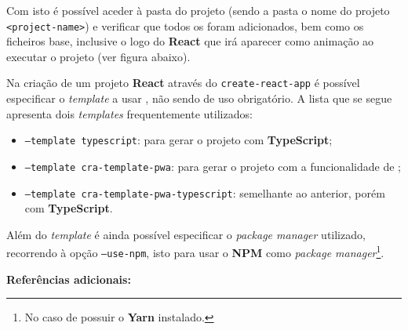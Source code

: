Com isto é possível aceder à pasta do projeto (sendo a pasta o nome do projeto \textemdash~ \texttt{<project-name>}) e verificar que todos os \textit{\underline{}} foram adicionados, bem como os ficheiros base, inclusive o logo do \textbf{React} que irá aparecer como animação ao executar o projeto {\scriptsize (ver figura abaixo)}.



Na criação de um projeto \textbf{React} através do \texttt{create-react-app} é possível especificar o \textit{template} a usar , não sendo de uso obrigatório. A lista que se segue apresenta dois \textit{templates} frequentemente utilizados:

\begin{itemize}
	\item \texttt{--template typescript}: para gerar o projeto com \textbf{TypeScript};
	\item \texttt{--template cra-template-pwa}: para gerar o projeto com a funcionalidade de ;
	\item \texttt{--template cra-template-pwa-typescript}: semelhante ao anterior, porém com \textbf{TypeScript}.
\end{itemize}

Além do \textit{template} é ainda possível especificar o \textit{package manager} utilizado, recorrendo à opção \texttt{--use-npm}, isto para usar o \textbf{NPM} como \textit{package manager}\footnote{No caso de possuir o \textbf{Yarn} instalado.}.

\vspace{30pt}

\textbf{Referências adicionais:} \cite{createReactProj,createReactAppSP,cReactAppCli}